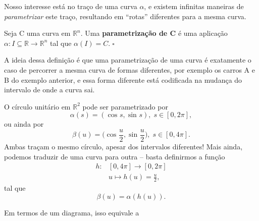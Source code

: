 \documentclass[../differential_geometry.tex]{subfiles}
\begin{document}
Nosso interesse está no traço de uma curva \(\alpha \), e existem infinitas maneiras de \textit{parametrizar} este traço, resultando em ``rotas'' diferentes para a mesma curva.
\begin{def*}
	Seja C uma curva em \(\mathbb{R}^{n}\). Uma \textbf{parametrização de C} é uma aplicação \(\alpha :I\subseteq \mathbb{R}\rightarrow \mathbb{R}^{n}\) tal que \(\alpha (I)=C.\; \square\)
\end{def*}
A ideia dessa definição é que uma parametrização de uma curva é exatamente o caso de percorrer a mesma curva de formas diferentes, por exemplo os carros A e B do exemplo anterior, e essa forma diferente está codificada na mudança do intervalo de onde a curva sai.
\begin{example}
	O círculo unitário em \(\mathbb{R}^{2}\) pode ser parametrizado por
	\[
		\alpha (s)=(\cos^{}{s}, \sin^{}{s}), \;s\in [0,2\pi ],
	\]
	ou ainda por
	\[
		\beta (u)=\biggl(\cos^{}{\frac{u}{2}}, \sin^{}{\frac{u}{2}}\biggr),\; s\in [0, 4\pi ].
	\]
	Ambas traçam o mesmo círculo, apesar dos intervalos diferentes! Mais ainda, podemos traduzir de uma curva para outra -- basta definirmos a função
	\begin{align*}
		h: & [0, 4\pi ]\rightarrow[0,2\pi ] \\
		   & u\longmapsto h(u)=\frac{u}{2},
	\end{align*}
	tal que
	\[
		\beta (u)=\alpha (h(u)).
	\]

	Em termos de um diagrama, isso equivale a
	\begin{center}
	\end{center}
\end{example}
\end{document}
